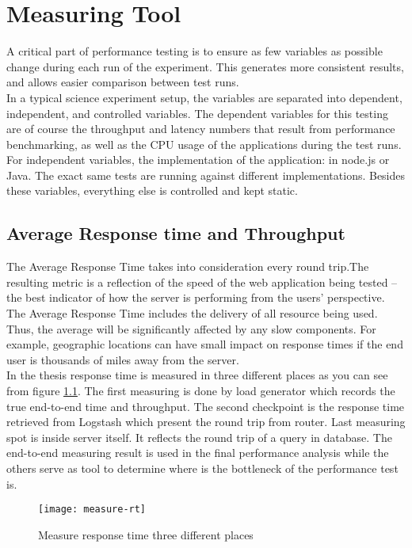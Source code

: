 \chapter{Measuring Tool}
A critical part of performance testing is to ensure as few variables as possible change during each run of the experiment. This generates more consistent results, and allows easier comparison between test runs.\\
In a typical science experiment setup, the variables are separated into dependent, independent, and controlled variables. The dependent variables for this testing are of course the throughput and latency numbers that result from performance benchmarking, as well as the CPU usage of the applications during the test runs. For independent variables, the implementation of the application: in node.js or Java. The exact same tests are running against different implementations. Besides these variables, everything else is controlled and kept static.\\


\section{Average Response time and Throughput}
The Average Response Time takes into consideration every round trip.The resulting metric is a reflection of the speed of the web application being tested – the best indicator of how the server is performing from the users’ perspective. The Average Response Time includes the delivery of all resource being used. Thus, the average will be significantly affected by any slow components. For example,  geographic locations can have small impact on response times if the end user is thousands of miles away from the server.\\
In the thesis response time is measured in three different places as you can see from figure \ref{measure-rt}. The first measuring is done by load generator which records the true end-to-end time and throughput. The second checkpoint is the response time retrieved from Logstash which present the round trip from router. Last measuring spot is inside server itself. It reflects the round trip of a query in database. The end-to-end measuring result is used in the final performance analysis while the others serve as tool to determine where is the bottleneck of the performance test is. \\

\begin{figure}[h]
	\centering
	\texttt{[image: measure-rt]}
	\caption{Measure response time three different places}
	\label{measure-rt}
\end{figure}

